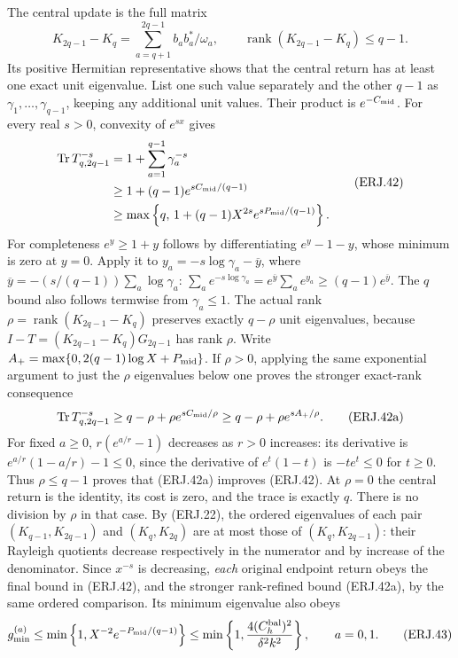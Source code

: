 The central update is the full matrix
\[
 K_{2q-1}-K_q=\sum_{a=q+1}^{2q-1}b_ab_a^*/\omega_a,
 \qquad\operatorname{rank}(K_{2q-1}-K_q)\le q-1.
 \tag{ERJ.41}
\]
Its positive Hermitian representative shows that the central return
has at least one exact unit eigenvalue. List one such value separately
and the other $q-1$ as $\gamma_1,\ldots,\gamma_{q-1}$, keeping
any additional unit values. Their product is $e^{-C_{\rm mid}}$.
For every real $s>0$, convexity of $e^{sx}$ gives
\[
\begin{split}
 \operatorname{Tr} T_{q,2q-1}^{-s}
 &=1+\sum_{a=1}^{q-1}\gamma_a^{-s}\\
 &\ge1+(q-1)e^{sC_{\rm mid}/(q-1)}\\
 &\ge\max\left\{q,\,
 1+(q-1)X^{2s}e^{sP_{\rm mid}/(q-1)}\right\}.
\end{split}\tag{ERJ.42}
\]
For completeness $e^y\ge1+y$ follows by differentiating
$e^y-1-y$, whose minimum is zero at $y=0$.
Apply it to $y_a=-s\log\gamma_a-\overline y$, where
$\overline y=-(s/(q-1))\sum_a\log\gamma_a$:
$\sum_a e^{-s\log\gamma_a}
=e^{\overline y}\sum_a e^{y_a}\ge(q-1)e^{\overline y}$.
The $q$ bound also follows termwise from
$\gamma_a\le1$.
The actual rank $\rho=\operatorname{rank}(K_{2q-1}-K_q)$ preserves
exactly $q-\rho$ unit eigenvalues, because
$I-T=(K_{2q-1}-K_q)G_{2q-1}$ has rank $\rho$.
Write $A_+=\max\{0,2(q-1)\log X+P_{\rm mid}\}$. If $\rho>0$,
applying the same exponential argument to just the $\rho$ eigenvalues
below one proves the stronger exact-rank consequence
\[
 \operatorname{Tr} T_{q,2q-1}^{-s}
 \ge q-\rho+\rho e^{sC_{\rm mid}/\rho}
 \ge q-\rho+\rho e^{sA_+/\rho}.\tag{ERJ.42a}
\]
For fixed $a\ge0$, $r(e^{a/r}-1)$ decreases as $r>0$ increases:
its derivative is $e^{a/r}(1-a/r)-1\le0$, since the derivative of
$e^t(1-t)$ is $-te^t\le0$ for $t\ge0$. Thus $\rho\le q-1$
proves that (ERJ.42a) improves (ERJ.42). At $\rho=0$ the central
return is the identity, its cost is zero, and the trace is exactly $q$.
There is no division by $\rho$ in that case.
By (ERJ.22), the ordered eigenvalues of each pair
$(K_{q-1},K_{2q-1})$ and $(K_q,K_{2q})$ are at most those of
$(K_q,K_{2q-1})$: their Rayleigh quotients decrease respectively
in the numerator and by increase of the denominator. Since $x^{-s}$
is decreasing, \emph{each} original endpoint return obeys the final
bound in (ERJ.42), and the stronger rank-refined bound (ERJ.42a),
by the same ordered comparison. Its minimum eigenvalue also obeys
\[
 g_{\min}^{(a)}\le
 \min\left\{1,X^{-2}e^{-P_{\rm mid}/(q-1)}\right\}
 \le\min\left\{1,\frac{4(C_h^{\rm bal})^2}{\delta^2k^2}\right\},
 \qquad a=0,1.\tag{ERJ.43}
\]
